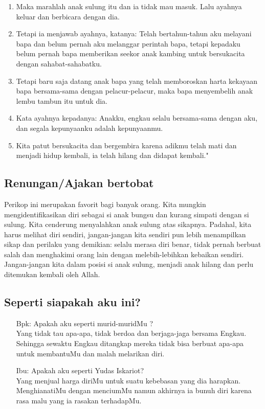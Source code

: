 \documentclass[a5paper,headsepline,titlepage,11pt,nnormalheadings,DIVcalc]{scrbook}
\newcommand{\BPP}[1]{\begin{itemize} \item[Bpk:] #1 \end{itemize}}
\newcommand{\BPW}[1]{\begin{itemize} \item[Ibu:] #1 \end{itemize}}
\begin{document}
\begin{enumerate}
\item Maka marahlah anak sulung itu dan ia tidak mau masuk. Lalu ayahnya keluar dan berbicara dengan dia.
\item Tetapi ia menjawab ayahnya, katanya: Telah bertahun-tahun aku melayani bapa dan belum pernah aku melanggar perintah bapa, tetapi kepadaku belum pernah bapa memberikan seekor anak kambing untuk bersukacita dengan sahabat-sahabatku.
\item Tetapi baru saja datang anak bapa yang telah memboroskan harta kekayaan bapa bersama-sama dengan pelacur-pelacur, maka bapa menyembelih anak lembu tambun itu untuk dia.
\item Kata ayahnya kepadanya: Anakku, engkau selalu bersama-sama dengan aku, dan segala kepunyaanku adalah kepunyaanmu.
\item Kita patut bersukacita dan bergembira karena adikmu telah mati dan menjadi hidup kembali, ia telah hilang dan didapat kembali."

\end{enumerate}

\subsection*{Renungan/Ajakan bertobat}
Perikop ini merupakan favorit bagi banyak orang. Kita mungkin mengidentifikasikan diri sebagai si anak bungsu dan kurang simpati dengan si sulung. Kita cenderung menyalahkan anak sulung atas sikapnya. Padahal, kita harus melihat diri sendiri, jangan-jangan kita sendiri pun lebih menampilkan sikap dan perilaku yang demikian: selalu merasa diri benar, tidak pernah berbuat salah dan menghakimi orang lain dengan melebih-lebihkan kebaikan sendiri. Jangan-jangan kita dalam posisi si anak sulung, menjadi anak hilang dan perlu ditemukan kembali oleh Allah.

\subsection*{\bf Seperti siapakah aku ini?}

\BPP{Apakah aku seperti murid-muridMu ?\\
Yang tidak tau apa-apa, tidak berdoa dan berjaga-jaga bersama Engkau.
Sehingga sewaktu Engkau ditangkap mereka tidak bisa berbuat apa-apa untuk
membantuMu dan malah melarikan diri.}

\BPW{Apakah aku seperti Yudas Iskariot?\\
Yang menjual harga diriMu untuk suatu kebebasan yang dia harapkan.
MenghianatiMu dengan menciumMu namun akhirnya ia bunuh diri karena rasa
malu yang ia rasakan terhadapMu.}
\end{document}
